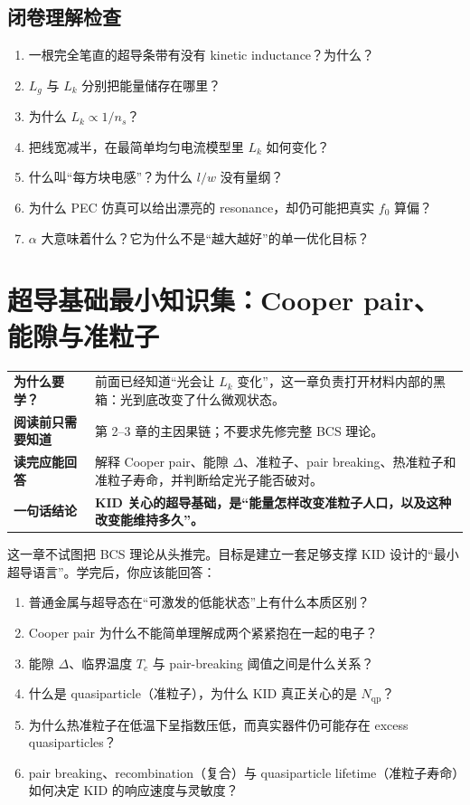\documentclass[11pt,a4paper,openany]{ctexrep}
\newcommand{\chapterguide}[4]{%
\begin{tcolorbox}[
  enhanced,
  breakable,
  colback=KidGray!45,
  colframe=KidBlue!65,
  boxrule=0.8pt,
  arc=2mm,
  title=本章导航,
  fonttitle=\bfseries,
  before skip=0.7em,
  after skip=1.0em]
\renewcommand{\arraystretch}{1.18}
\begin{tabularx}{\textwidth}{>{\bfseries\color{KidBlue}}p{3.0cm} X}
为什么要学？ & #1 \\
阅读前只需要知道 & #2 \\
读完应能回答 & #3 \\
一句话结论 & \textbf{#4} \\
\end{tabularx}
\end{tcolorbox}%
}
\newcommand{\qp}{\mathrm{qp}}
\begin{document}
\section{闭卷理解检查}
\begin{checkpointbox}
\begin{enumerate}
  \item 一根完全笔直的超导条带有没有 kinetic inductance？为什么？
  \item $L_g$ 与 $L_k$ 分别把能量储存在哪里？
  \item 为什么 $L_k\propto1/n_s$？
  \item 把线宽减半，在最简单均匀电流模型里 $L_k$ 如何变化？
  \item 什么叫“每方块电感”？为什么 $l/w$ 没有量纲？
  \item 为什么 PEC 仿真可以给出漂亮的 resonance，却仍可能把真实 $f_0$ 算偏？
  \item $\alpha$ 大意味着什么？它为什么不是“越大越好”的单一优化目标？
\end{enumerate}
\end{checkpointbox}


\chapter{超导基础最小知识集：Cooper pair、能隙与准粒子}
\chapterguide
{前面已经知道“光会让 $L_k$ 变化”，这一章负责打开材料内部的黑箱：光到底改变了什么微观状态。}
{第 2--3 章的主因果链；不要求先修完整 BCS 理论。}
{解释 Cooper pair、能隙 $\Delta$、准粒子、pair breaking、热准粒子和准粒子寿命，并判断给定光子能否破对。}
{KID 关心的超导基础，是“能量怎样改变准粒子人口，以及这种改变能维持多久”。}

\begin{goalbox}
这一章不试图把 BCS 理论从头推完。目标是建立一套足够支撑 KID 设计的“最小超导语言”。学完后，你应该能回答：
\begin{enumerate}
  \item 普通金属与超导态在“可激发的低能状态”上有什么本质区别？
  \item Cooper pair 为什么不能简单理解成两个紧紧抱在一起的电子？
  \item 能隙 $\Delta$、临界温度 $T_c$ 与 pair-breaking 阈值之间是什么关系？
  \item 什么是 quasiparticle（准粒子），为什么 KID 真正关心的是 $N_{\qp}$？
  \item 为什么热准粒子在低温下呈指数压低，而真实器件仍可能存在 excess quasiparticles？
  \item pair breaking、recombination（复合）与 quasiparticle lifetime（准粒子寿命）如何决定 KID 的响应速度与灵敏度？
\end{enumerate}
\end{goalbox}
\end{document}
